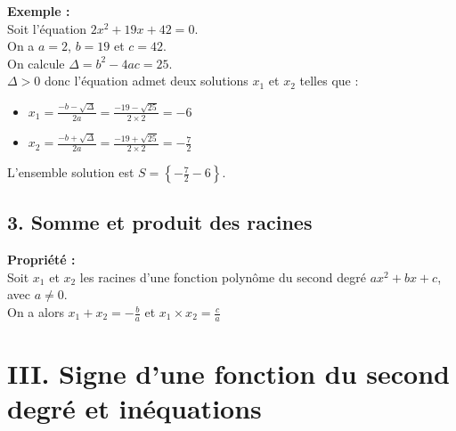 \documentclass[11pt,a4paper]{article}
\begin{document}
\textbf{Exemple :} \\
Soit l'équation $2x^2+19x+42=0$. \\

On a $a=2$, $b=19$ et $c=42$. \\
On calcule $\Delta=b^2-4ac=25$. \\
$\Delta>0$ donc l'équation admet deux solutions $x_1$ et $x_2$ telles que :
\vspace{-6pt}
\begin{itemize}
	\item $x_1=\frac{-b-\sqrt{\Delta}}{2a}=\frac{-19-\sqrt{25}}{2\times2}=-6$ 
	\item $x_2=\frac{-b+\sqrt{\Delta}}{2a}=\frac{-19+\sqrt{25}}{2\times2}=-\frac{7}{2}$ 
\end{itemize}

L'ensemble solution est $S=\left\{-\frac{7}{2}-6\right\}$. 

\subsection*{3. Somme et produit des racines}

\begin{mdframed}[style=proprieteStyle]
	\textbf{Propriété :} ~\\
	Soit $x_1$ et $x_2$ les racines d'une fonction polynôme du second degré $ax^2+bx+c$, avec $a\not=0$. \\
	On a alors $x_1+x_2=-\frac{b}{a}$ et $x_1\times x_2=\frac{c}{a}$
\end{mdframed}

\newpage

\section*{III. Signe d'une fonction du second degré et inéquations}
\end{document}

